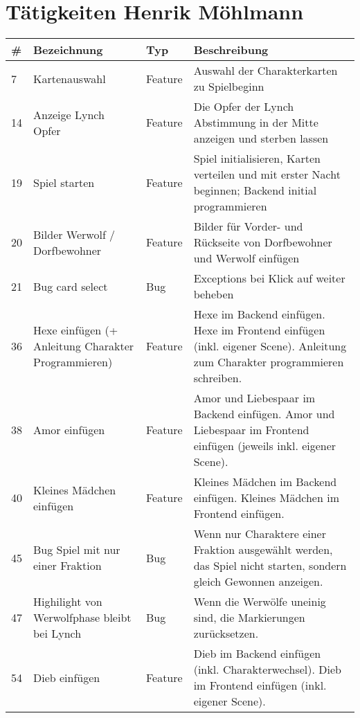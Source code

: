 \newpage
\section{Tätigkeiten Henrik Möhlmann}

\begin{tabularx}{\textwidth}{|l|p{4.5cm}|l|X|}
	\hline                                              %
	\textbf{\#}  &    \textbf{Bezeichnung}  &    \textbf{Typ}  & \textbf{Beschreibung}	 \\ 
	\hline \hline      
	\endhead
	
	7 \label{iss:7}	&	Kartenauswahl	&	Feature	&	Auswahl der Charakterkarten zu Spielbeginn  \\ \hline
	14 \label{iss:14}	&	Anzeige Lynch Opfer	&	Feature	&	Die Opfer der Lynch Abstimmung in der Mitte anzeigen und sterben lassen  \\ \hline
	19 \label{iss:19}	&	Spiel starten	&	Feature	&	Spiel initialisieren, Karten verteilen und mit erster Nacht beginnen; Backend initial programmieren  \\ \hline
	20 \label{iss:20}	&	Bilder Werwolf / Dorfbewohner	&	Feature	&	Bilder für Vorder- und Rückseite von Dorfbewohner und Werwolf einfügen  \\ \hline
	21 \label{iss:21}	&	Bug card select	&	Bug	&	Exceptions bei Klick auf \glqq weiter\grqq{} beheben  \\ \hline
	36 \label{iss:36}	&	Hexe einfügen (+ Anleitung Charakter Programmieren)	&	Feature	&	Hexe im Backend einfügen. Hexe im Frontend einfügen (inkl. eigener Scene). Anleitung zum Charakter programmieren schreiben.   \\ \hline
	38 \label{iss:38}	&	Amor einfügen	&	Feature	&	Amor und Liebespaar im Backend einfügen. Amor und Liebespaar im Frontend einfügen (jeweils inkl. eigener Scene).   \\ \hline
	40 \label{iss:40}	&	Kleines Mädchen einfügen	&	Feature	&	Kleines Mädchen im Backend einfügen. Kleines Mädchen im Frontend einfügen.   \\ \hline
	45 \label{iss:45}	&	Bug Spiel mit nur einer Fraktion	&	Bug	&	Wenn nur Charaktere einer Fraktion ausgewählt werden, das Spiel nicht starten, sondern gleich Gewonnen anzeigen.   \\ \hline
	47 \label{iss:47}	&	Highilight von Werwolfphase bleibt bei Lynch	&	Bug	&	Wenn die Werwölfe uneinig sind, die Markierungen zurücksetzen.   \\ \hline
	54 \label{iss:54}	&	Dieb einfügen	&	Feature	&	Dieb im Backend einfügen (inkl. Charakterwechsel). Dieb im Frontend einfügen (inkl. eigener Scene).   \\ \hline

\end{tabularx}
